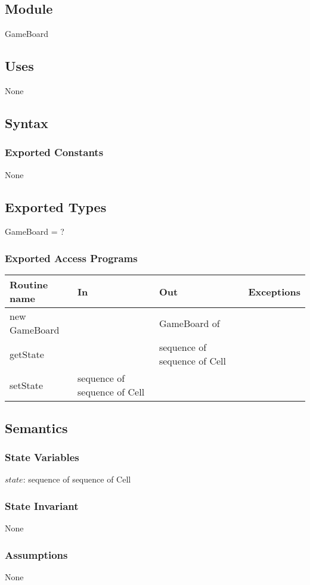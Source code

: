 \documentclass[12pt]{article}
\begin{document}
\subsection* {Module}
GameBoard
\subsection* {Uses}
None
\subsection* {Syntax}
\subsubsection* {Exported Constants}
None
\subsection* {Exported Types}
GameBoard = ?

\subsubsection* {Exported Access Programs}

\begin{tabular}{| l | l | l | p{3cm} |}
\hline
\textbf{Routine name} & \textbf{In} & \textbf{Out} & \textbf{Exceptions}\\
\hline
new GameBoard & & GameBoard of  & \\
\hline
getState & & sequence of sequence of Cell & \\
\hline
setState & sequence of sequence of Cell && \\
\hline
\end{tabular}

\subsection* {Semantics}
\subsubsection*{State Variables}
$state$: sequence of sequence of Cell\\
\subsubsection* {State Invariant}
None

\subsubsection* {Assumptions}
None
\end{document}
